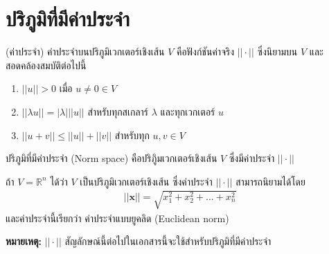 \section{ปริภูมิที่มีค่าประจำ}

\begin{Definition}
    (ค่าประจำ)  ค่าประจำบนปริภูมิเวกเตอร์เชิงเส้น $V$ คือฟังก์ชันค่าจริง $ || \cdot ||$ ซึ่งนิยามบน $V$ และสอดคล้องสมบัติต่อไปนี้ 
    \begin{enumerate}
        \item $ ||u|| > 0 $ เมื่อ $ u \neq 0 \in V $
        \item $|| \lambda u || = | \lambda | || u || $ สำหรับทุกสเกลาร์ $\lambda$ และทุกเวกเตอร์ $u$
        \item $ ||u+v|| \leq ||u|| + ||v || $ สำหรับทุก $u,v \in V$
    \end{enumerate}
\end{Definition}

\begin{Definition} ปริภูมิที่มีค่าประจำ (Norm space) คือปริภูิมเวกเตอร์เชิงเส้น $V$ ซึ่งมีค่าประจำ $ || \cdot ||$
\end{Definition}

\begin{Example}
    ถ้า $V = \mathbb{R}^{n}$ ได้ว่า $V$ เป็นปริภูมิเวกเตอร์เชิงเส้น ซึ่งค่าประจำ $ || \cdot ||$ สามารถนิยามได้โดย
    \begin{align}
        || \boldsymbol{x} || = \sqrt{x_1^2 + x_2^2 + ... + x_n^2 } 
    \end{align}
    และค่าประจำนี้เรียกว่า ค่าประจำแบบยูคลิด (Euclidean norm) 
\end{Example}

\textbf{หมายเหตุ:} $ || \cdot ||$ สัญลักษณ์นี้ต่อไปในเอกสารนี้จะใช้สำหรับปริภูมิที่มีค่าประจำ